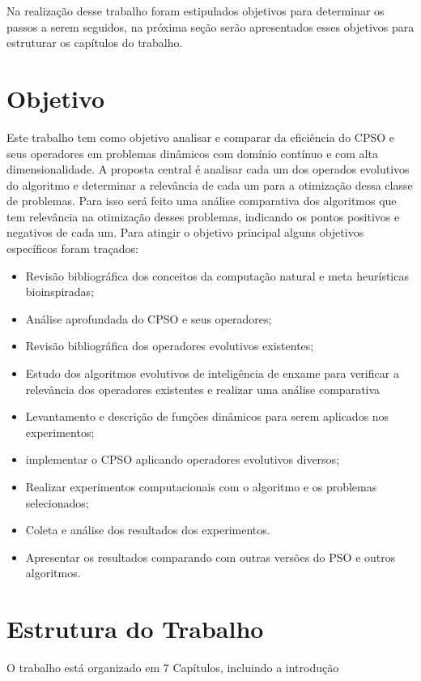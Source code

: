 Na realização desse trabalho foram estipulados objetivos para determinar os passos a serem seguidos, na próxima seção serão apresentados esses objetivos para estruturar os capítulos do trabalho.

\section{Objetivo}
\label{sec:objetivo}
Este trabalho tem como objetivo analisar e comparar da eficiência do CPSO e seus operadores em problemas dinâmicos com domínio contínuo e com alta dimensionalidade. A proposta central é analisar cada um dos operados evolutivos do algoritmo e determinar a relevância de cada um para a otimização dessa classe de problemas. Para isso será feito uma análise comparativa dos algoritmos que tem relevância na otimização desses problemas, indicando os pontos positivos e negativos de cada um. Para atingir o objetivo principal alguns objetivos específicos foram traçados:

\begin{itemize}
\item Revisão bibliográfica dos conceitos da computação natural e meta heurísticas bioinspiradas;
\item Análise aprofundada do CPSO e seus operadores;
\item Revisão bibliográfica dos operadores evolutivos existentes;
\item Estudo dos algoritmos evolutivos de inteligência de enxame para verificar a relevância dos operadores existentes e realizar uma análise comparativa
\item Levantamento e descrição de funções dinâmicos para serem aplicados nos experimentos;
\item implementar o CPSO aplicando operadores evolutivos diversos;
\item Realizar experimentos computacionais com o algoritmo e os problemas selecionados;
\item Coleta e análise dos resultados dos experimentos.
\item Apresentar os resultados comparando com outras versões do PSO e outros algoritmos.
\end{itemize}

\section{Estrutura do Trabalho}
\label{sec:escopo}

O trabalho está organizado em 7 Capítulos, incluindo a introdução

